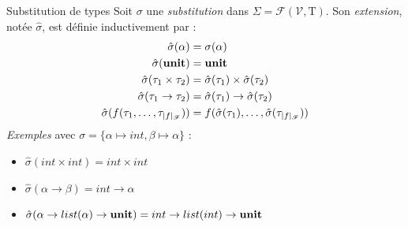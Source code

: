 \documentclass[serif]{beamer}
\newcommand{\exemples}{\textit{Exemples}\xspace}
\newcommand{\unit}{\bold{unit}}
\newcommand{\V}{\mathscr{V}}
\newcommand{\F}{\mathscr{F}}
\newcommand{\T}{\mathrm{T}}
\begin{document}
\begin{frame}{Substitution de types}
\small
Soit $\sigma$ une \emph{substitution} dans $\Sigma = \mathscr{F} (\V, \T)$. Son \emph{extension}, notée $\hat\sigma$, est définie inductivement par :
\begin{align*}
    \hat\sigma (\alpha) &=
    \sigma (\alpha)
  \\
    \hat\sigma (\unit) &=
    \unit
  \\
    \hat\sigma (\tau_1 \times \tau_2) &=
    \hat\sigma (\tau_1) \times \hat\sigma (\tau_2)
  \\
    \hat\sigma (\tau_1 \rightarrow \tau_2) &=
    \hat\sigma (\tau_1) \rightarrow \hat\sigma (\tau_2)
  \\
    \hat\sigma (f (\tau_1, \dots, \tau_{|f|_\F})) &=
    f (\hat\sigma (\tau_1), \dots, \hat\sigma (\tau_{|f|_\F}))
\end{align*}
\exemples avec $\sigma = \{ \alpha \mapsto int, \beta \mapsto \alpha \}$ :
\begin{itemize}
  \item $\hat\sigma (int \times int) = int \times int$
  \item $\hat\sigma (\alpha \rightarrow \beta) = int \rightarrow \alpha$
  \item $\hat\sigma (\alpha \rightarrow list (\alpha) \rightarrow \unit) = int \rightarrow list (int) \rightarrow \unit$
\end{itemize}
\end{frame}

\end{document}

